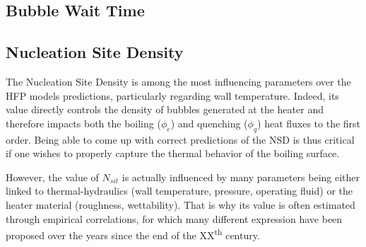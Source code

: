 \subsection{Bubble Wait Time}

\begin{table}[h!]


\noindent{}

\caption{Bubble wait time data in vertical flow boiling}
\label{tab:tw_exp_data}



\end{table}



\subsection{Nucleation Site Density}

The Nucleation Site Density is among the most influencing parameters over the HFP models predictions, particularly regarding wall temperature. Indeed, its value directly controls the density of bubbles generated at the heater and therefore impacts both the boiling ($\phi_{e}$) and quenching ($\phi_{q}$) heat fluxes to the first order. Being able to come up with correct predictions of the NSD is thus critical if one wishes to properly capture the thermal behavior of the boiling surface.

However, the value of $N_{sit}$ is actually influenced by many parameters being either linked to thermal-hydraulics (wall temperature, pressure, operating fluid) or the heater material (roughness, wettability). That is why its value is often estimated through empirical correlations, for which many different expression have been proposed over the years since the end of the XX\textsuperscript{th} century.

